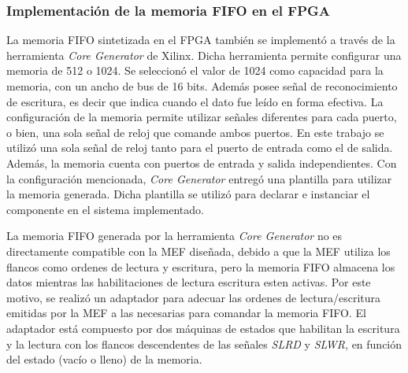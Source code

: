 	\subsubsection{Implementación de la memoria FIFO en el FPGA}
		La memoria FIFO sintetizada en el FPGA también se implementó a través de la herramienta {\it Core Generator} de Xilinx. Dicha herramienta permite configurar una memoria de \si{512} o \SI{1024}{\byte}. Se seleccionó el valor de \SI{1024}{\byte} como capacidad para la memoria, con un ancho de bus de 16 bits. Además posee señal de reconocimiento de escritura, es decir que indica cuando el dato fue leído en forma efectiva. La configuración de la memoria permite utilizar señales diferentes para cada puerto, o bien, una sola señal de reloj que comande ambos puertos. En este trabajo se utilizó una sola señal de reloj tanto para el puerto de entrada como el de salida. Además, la memoria cuenta con puertos de entrada y salida independientes. Con la configuración mencionada, {\it Core Generator} entregó una plantilla para utilizar la memoria generada. Dicha plantilla se utilizó para declarar e instanciar el componente en el sistema implementado. 
		
		
		La memoria FIFO generada por la herramienta \textit{Core Generator} no es directamente compatible con la MEF diseñada, debido a que la MEF utiliza los flancos como ordenes de lectura y escritura, pero la memoria FIFO almacena los datos mientras las habilitaciones de lectura escritura esten activas. Por este motivo, se realizó un adaptador para adecuar las ordenes de lectura/escritura emitidas por la MEF a las necesarias para comandar la memoria FIFO. El adaptador está compuesto por dos máquinas de estados que habilitan la escritura y la lectura con los flancos descendentes de las señales \textit{SLRD} y \textit{SLWR}, en función del estado (vacío o lleno) de la memoria.
		
